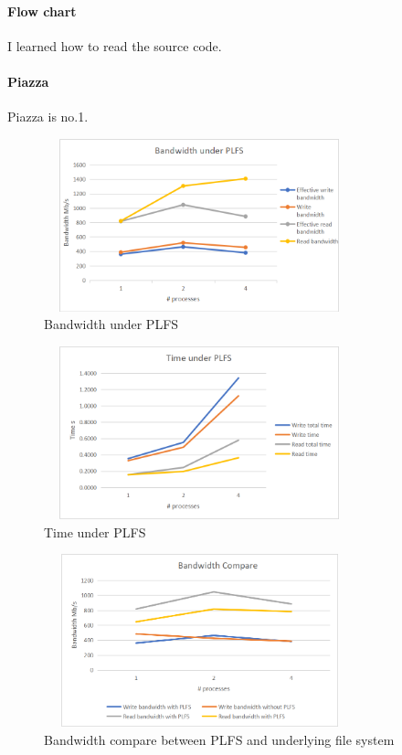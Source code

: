 \documentclass[conference]{IEEEtran}
\begin{document}
\paragraph{Flow chart} I learned how to read the source code.
\paragraph{Piazza} Piazza is no.1.

\begin{figure}
	\centerline{
	\includegraphics[width=9cm,height=5cm]{Bandwidth_PLFS.png}}
	\caption{Bandwidth under PLFS}
\end{figure}

\begin{figure}
	\centerline{
	\includegraphics[width=9cm,height=5cm]{Time_PLFS.png}}
	\caption{Time under PLFS}
\end{figure}

\begin{figure}
	\centerline{
	\includegraphics[width=9cm,height=5cm]{Bandwidth_Compare.png}}
	\caption{Bandwidth compare between PLFS and underlying file system}
\end{figure}
\end{document}
